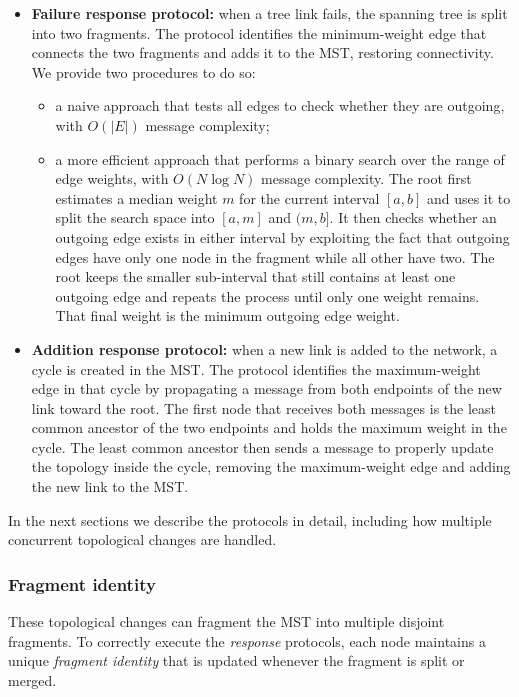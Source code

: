 \begin{itemize}
  \item \textbf{Failure response protocol:} when a tree link fails, the spanning tree is split into two fragments. The protocol identifies the minimum-weight edge that connects the two fragments and adds it to the MST, restoring connectivity. We provide two procedures to do so:
  \begin{itemize}
    \item a naive approach that tests all edges to check whether they are outgoing, with $O(|E|)$ message complexity;
    \item a more efficient approach that performs a binary search over the range of edge weights, with $O(N\log N)$ message complexity. The root first estimates a median weight $m$ for the current interval $[a,b]$ and uses it to split the search space into $[a,m]$ and $(m,b]$. It then checks whether an outgoing edge exists in either interval by exploiting the fact that outgoing edges have only one node in the fragment while all other have two. The root keeps the smaller sub-interval that still contains at least one outgoing edge and repeats the process until only one weight remains. That final weight is
    the minimum outgoing edge weight.
  \end{itemize}
  \item \textbf{Addition response protocol:} when a new link is added to the network, a cycle is created in the MST. The protocol identifies the maximum-weight edge in that cycle by propagating a message from both endpoints of the new link toward the root. The first node that receives both messages is the least common ancestor of the two endpoints and holds the maximum weight in the cycle. The least common ancestor then sends a message to properly update the topology inside the cycle, removing the maximum-weight edge and adding the new link to the MST.
\end{itemize}

In the next sections we describe the protocols in detail, including how multiple concurrent topological changes are handled.

\subsubsection{Fragment identity}

These topological changes can fragment the MST into multiple disjoint fragments. To
correctly execute the \emph{response} protocols, each node maintains a unique
\emph{fragment identity} that is updated whenever the fragment is split or merged.

